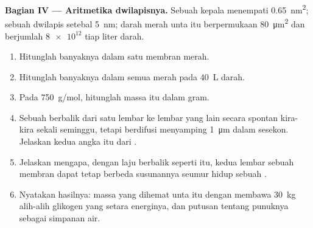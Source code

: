 \begin{problem}
\medskip
\noindent\textbf{Bagian IV --- Aritmetika dwilapisnya.}
Sebuah kepala  menempati \qty{0.65}{nm^2}; sebuah dwilapis
setebal \qty{5}{nm};  darah merah unta itu berpermukaan
\qty{80}{\micro m^2} dan berjumlah $\num{8e12}$ tiap liter darah.
\begin{enumerate}[resume]
  \item Hitunglah banyaknya  dalam satu membran  merah.
  \item Hitunglah banyaknya dalam semua  merah pada \qty{40}{L} darah.
  \item Pada \qty{750}{g/mol}, hitunglah massa  itu dalam gram.
  \item Sebuah  berbalik dari satu lembar ke lembar yang lain
        secara spontan kira-kira sekali seminggu, tetapi berdifusi
        menyamping \qty{1}{\micro m} dalam sesekon. Jelaskan kedua angka
        itu dari .
  \item Jelaskan mengapa, dengan laju berbalik seperti itu, kedua lembar
        sebuah membran dapat tetap berbeda susunannya seumur hidup
        sebuah .
  \item Nyatakan hasilnya: massa yang dihemat unta itu dengan membawa
        \qty{30}{kg}  alih-alih glikogen yang setara energinya,
        dan putusan tentang punuknya sebagai simpanan air.
\end{enumerate}
\end{problem}
